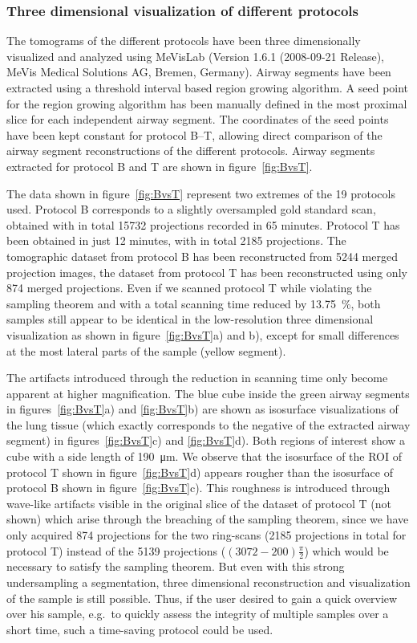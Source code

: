 \subsubsection{Three dimensional visualization of different protocols}%
\label{subsec:comparison}%
The tomograms of the different protocols have been three dimensionally visualized and analyzed using MeVisLab (Version 1.6.1 (2008-09-21 Release), MeVis Medical Solutions AG, Bremen, Germany). Airway segments have been extracted using a threshold interval based region growing algorithm. A seed point for the region growing algorithm has been manually defined in the most proximal slice for each independent airway segment. The coordinates of the seed points have been kept constant for protocol B--T, allowing direct comparison of the airway segment reconstructions of the different protocols. Airway segments extracted for protocol B and T are shown in figure~\ref{fig:BvsT}.

The data shown in figure~\ref{fig:BvsT} represent two extremes of the 19 protocols used. Protocol B corresponds to a slightly oversampled gold standard scan, obtained with in total 15732 projections recorded in 65 minutes. Protocol T has been obtained in just 12 minutes, with in total 2185 projections. The tomographic dataset from protocol B has been reconstructed from 5244 merged projection images, the dataset from protocol T has been reconstructed using only 874 merged projections. Even if we scanned protocol T while violating the sampling theorem and with a total scanning time reduced by \SI{13.75}{\percent}, both samples still appear to be identical in the low-resolution three dimensional visualization as shown in figure~\ref{fig:BvsT}a) and b), except for small differences at the most lateral parts of the sample (yellow segment).

The artifacts introduced through the reduction in scanning time only become apparent at higher magnification. The blue cube inside the green airway segments in figures~\ref{fig:BvsT}a) and \ref{fig:BvsT}b) are shown as isosurface visualizations of the lung tissue (which exactly corresponds to the negative of the extracted airway segment) in figures~\ref{fig:BvsT}c) and \ref{fig:BvsT}d). Both regions of interest show a cube with a side length of \SI{190}{\micro\meter}. We observe that the isosurface of the ROI of protocol T shown in figure~\ref{fig:BvsT}d) appears rougher than the isosurface of protocol B shown in figure~\ref{fig:BvsT}c). This roughness is introduced through wave-like artifacts visible in the original slice of the dataset of protocol T (not shown) which arise through the breaching of the sampling theorem, since we have only acquired 874 projections for the two ring-scans (2185 projections in total for protocol T) instead of the 5139 projections ($(3072-200)\frac{\pi}{2}$) which would be necessary to satisfy the sampling theorem. But even with this strong undersampling a segmentation, three dimensional reconstruction and visualization of the sample is still possible. Thus, if the user desired to gain a quick overview over his sample, e.g.\ to quickly assess the integrity of multiple samples over a short time, such a time-saving protocol could be used.


